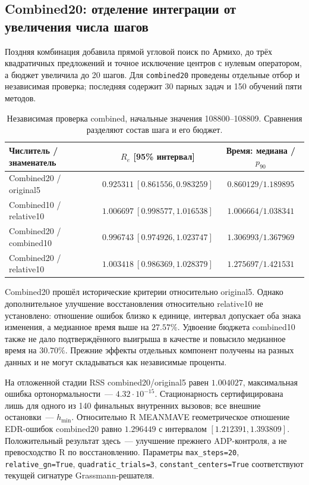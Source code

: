 \documentclass[11pt,a4paper]{article}
\numberwithin{equation}{section}
\newcommand{\file}[1]{\nolinkurl{#1}}
\begin{document}
\subsection{Combined20: отделение интеграции от увеличения числа шагов}

Поздняя комбинация добавила прямой угловой поиск по Армихо,
до трёх квадратичных предложений и точное исключение центров с нулевым
оператором, а бюджет увеличила до 20 шагов. Для \file{combined20}
проведены отдельные отбор и независимая проверка; последняя содержит
30 парных задач и 150 обучений пяти методов.

\begin{table}[htbp]
\centering\small
\caption{Независимая проверка combined, начальные значения
108800--108809. Сравнения разделяют состав шага и его бюджет.}
\label{tab:combined}
\begin{tabularx}{\linewidth}{@{}Xcc@{}}
\toprule
Числитель / знаменатель & $R_e$ [95\% интервал]
 & Время: медиана / $p_{90}$\\
\midrule
Combined20 / original5 & $0.925311\ [0.861556,0.983259]$ & $0.860129/1.189895$\\
Combined10 / relative10 & $1.006697\ [0.998577,1.016538]$ & $1.006664/1.038341$\\
Combined20 / combined10 & $0.996743\ [0.974926,1.023747]$ & $1.306993/1.367969$\\
Combined20 / relative10 & $1.003418\ [0.986369,1.028379]$ & $1.275697/1.421531$\\
\bottomrule
\end{tabularx}
\end{table}

Combined20 прошёл исторические критерии относительно original5.
Однако дополнительное улучшение восстановления относительно relative10
не установлено: отношение ошибок близко к единице, интервал допускает
оба знака изменения, а медианное время выше на $27.57\%$.
Удвоение бюджета combined10 также не дало подтверждённого выигрыша
в качестве и повысило медианное время на $30.70\%$.
Прежние эффекты отдельных компонент получены на разных данных
и не могут складываться как независимые проценты.

На отложенной стадии RSS combined20/original5 равен $1.004027$,
максимальная ошибка ортонормальности~--- $4.32\cdot10^{-15}$.
Стационарность сертифицирована лишь для одного из 140 финальных
внутренних вызовов; все внешние остановки~--- $h_{\min}$.
Относительно R MEANMAVE геометрическое отношение EDR-ошибок
combined20 равно $1.296449$ с интервалом $[1.212391,1.393809]$.
Положительный результат здесь~--- улучшение прежнего ADP-контроля,
а не превосходство R по восстановлению.
Параметры \file{max_steps=20}, \file{relative_gn=True},
\file{quadratic_trials=3}, \file{constant_centers=True}
соответствуют текущей сигнатуре Grassmann-решателя.
\cite{combined,currentcode}
\end{document}
